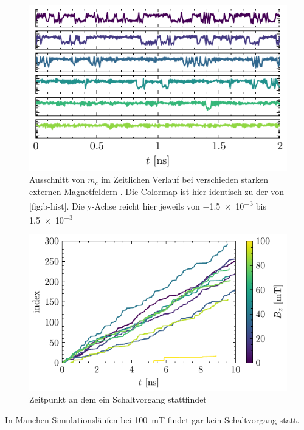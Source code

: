 \documentclass[main.tex]{subfiles}
\begin{document}
\begin{figure}[H]
    \centering
    \includegraphics{bilder/plots/max_Bz/mc_time.pdf}
    \caption{Ausschnitt von \(m_c\) im Zeitlichen Verlauf bei verschieden starken externen Magnetfeldern . Die Colormap ist hier identisch zu der von \cref{fig:b-hist}. Die y-Achse reicht hier jeweils von \num{-1.5e-3} bis \num{+1.5e-3}}\label{fig:b-time}    
\end{figure}

\begin{figure}[H]
    \centering
    \includegraphics{bilder/plots/max_Bz/switch_events.pdf}
    \caption{Zeitpunkt an dem ein Schaltvorgang stattfindet}\label{fig:bz-switch-events}   
\end{figure}


In Manchen Simulationsläufen bei \SI{100}{\milli\tesla} findet gar kein Schaltvorgang statt.
\end{document}
